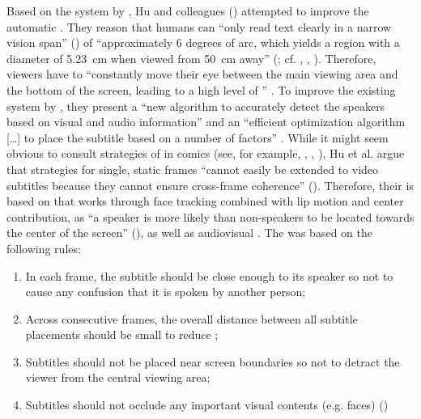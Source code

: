 Based on the system by \citet{Hong2010}, Hu and colleagues (\citeyear{Hu2013}) attempted to improve the automatic . They reason that humans can “only read text clearly in a narrow vision span” (\citeyear{Hu2013})  of “approximately 6 degrees of arc, which yields a region with a diameter of 5.23~cm when viewed from 50~cm away” (\citeyear{Hu2013}; cf. \citealt{rayner1975}, \citealt{Just1987}, \citealt{mcconkie1989}). Therefore, viewers have to “constantly move their eye  between the main viewing area and the bottom of the screen, leading to a high level of ” \citep{Hu2013}. To improve the existing system by \citet{Hong2010}, they present a “new  algorithm to accurately detect the speakers based on visual and audio information” and an “efficient optimization algorithm […] to place the subtitle based on a number of factors” \citep{Hu2013}. While it might seem obvious to consult strategies of  in comics (see, for example, \citealt{Kurlander1996}, \citealt{Chun2006}, \citealt{Groensteen2007}), Hu et al. argue that  strategies for single, static frames “cannot easily be extended to video subtitles because they cannot ensure cross-frame coherence” (\citeyear{Hu2013}). Therefore, their  is based on  that works through face tracking combined with lip motion and center contribution, as “a speaker is more likely than non-speakers to be located towards the center of the screen” (\citeyear{Hu2013}), as well as audiovisual . The  was based on the following rules:

\sloppy
\begin{enumerate}
\item   In each frame, the subtitle should be close enough to its speaker so not to cause any confusion that it is spoken by another person; 
\item   Across consecutive frames, the overall distance between all subtitle placements should be small to reduce ; 
\item   Subtitles should not be placed near screen boundaries so not to detract the viewer from the central viewing area;
\item   Subtitles should not occlude any important visual contents (e.g. faces) (\citeyear{Hu2013})
\end{enumerate}
\fussy 

